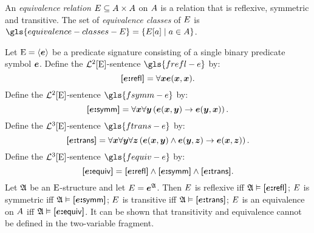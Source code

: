 An \emph{equivalence relation} $\relE \subseteq \domAA$ on $\domA$
is a relation that is reflexive, symmetric and transitive.
The set of \emph{equivalence classes} of $\relE$ is
$\gls{equivalence-classes-E} = \setbd{\relE[\ea]}{\ea \in \domA}$.

Let $\ES = \seq{\se}$ be a predicate signature consisting of a single binary
predicate symbol $\se$.
Define the $\vFoF2\ES$-sentence $\gls{frefl-e}$ by:
\[
  \frefl\se = \forall\xx \se(\xx,\xx).
\]
Define the $\vFoF2\ES$-sentence $\gls{fsymm-e}$ by:
\[
  \fsymm\se = \forall\xx\forall\yy 
  \left(\se(\xx,\yy) \limp \se(\yy,\xx)\right).
\]
Define the $\vFoF3\ES$-sentence $\gls{ftrans-e}$ by:
\[
  \ftrans\se = \forall\xx\forall\yy\forall\zz
  \left(\se(\xx,\yy) \land \se(\yy,\zz) \limp \se(\xx,\zz)\right).
\]
Define the $\vFoF3\ES$-sentence $\gls{fequiv-e}$ by:
\[
  \fequiv\se = \frefl\se \land \fsymm\se \land \ftrans\se.
\]
Let $\StrA$ be an $\ES$-structure and let $\relE = \se^\StrA$.
Then $\relE$ is reflexive iff $\StrA \vDash \frefl\se$;
$\relE$ is symmetric iff $\StrA \vDash \fsymm\se$;
$\relE$ is transitive iff $\StrA \vDash \ftrans\se$;
$\relE$ is an equivalence on $\domA$ iff $\StrA \vDash \fequiv\se$.
It can be shown that transitivity and equivalence cannot be defined in the
two-variable fragment.